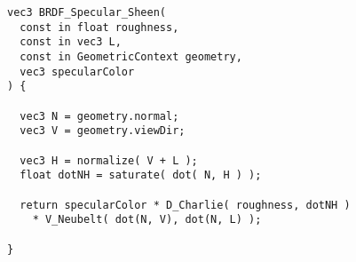   \singlespacing

  \begin{lstlisting}[caption={BRDF del modelo de \textit{sheen} de ThreeJs}]
vec3 BRDF_Specular_Sheen(
  const in float roughness,
  const in vec3 L,
  const in GeometricContext geometry,
  vec3 specularColor
) {

  vec3 N = geometry.normal;
  vec3 V = geometry.viewDir;

  vec3 H = normalize( V + L );
  float dotNH = saturate( dot( N, H ) );

  return specularColor * D_Charlie( roughness, dotNH )
    * V_Neubelt( dot(N, V), dot(N, L) );

}
  \end{lstlisting}